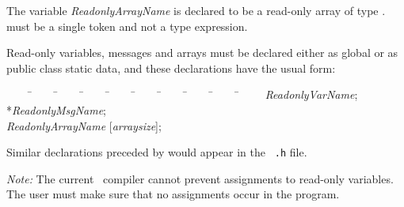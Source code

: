 The variable {\it ReadonlyArrayName} is declared to be a read-only
array of type .  must be a single token and not a
type expression.

Read-only variables, messages and arrays must be declared either as
global or as public class static data, and these declarations have the
usual form:

\begin{tabbing}
~~~~ \=~~~~ \=~~~~ \=~~~~ \=~~~~ \=~~~~ \=~~~~ \=~~~~ \=~~~~ \=~~~~ \kill
\>  {\it ReadonlyVarName}; \\
\>  *{\it ReadonlyMsgName}; \\
\>  {\it ReadonlyArrayName} [{\it arraysize}];
\end{tabbing}

Similar declarations preceded by  would appear in the {\tt
.h} file. 

{\it Note:}  The current \charmpp\ compiler cannot prevent
assignments to read-only variables.  The user must make sure that no
assignments occur in the program.




